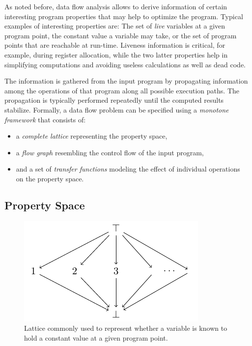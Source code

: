As noted before, data flow analysis allows to derive information of certain
interesting program properties that may help to optimize the program. Typical
examples of interesting properties are: The set of \emph{live} variables at a
given program point, the constant value a variable may take, or the set of
program points that are reachable at run-time. Liveness information is critical,
for example, during register allocation, while the two latter properties help
in simplifying computations and avoiding useless calculations as well as dead
code.

The information is gathered from the input program by propagating information
among the operations of that program along all possible execution paths. The
propagation is typically performed repeatedly until the computed results
stabilize. Formally, a data flow problem can be specified using a \emph{monotone
framework} that consists of:
\begin{itemize}
  \item a \emph{complete lattice} representing the property space,
  \item a \emph{flow graph} resembling the control flow of the input program,
  \item and a set of \emph{transfer functions} modeling the effect of individual
        operations \\ on the property space.
\end{itemize}

\subsection{Property Space}
\label{novillo:sec:property_space}


\begin{figure}[b]
  \vspace{-1em}
  \begin{center}
    \includegraphics{constprop_lattice}
  \end{center}
  \vspace{-1em}
  \caption{Lattice commonly used to represent whether a variable is known to
           hold a constant value at a given program point.}
  \label{novillo:fig:lattice_constant_propagation}
  \vspace{-1em}
\end{figure}

